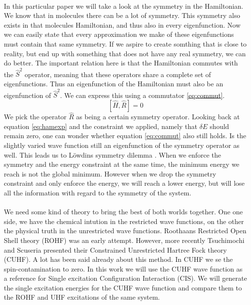 \documentclass[twoside,twocolumn,9pt]{article}
\begin{document}
\paragraph*{}
In this particular paper we will take a look at the symmetry in the Hamiltonian. We know that in molecules there can be a lot of symmetry. This symmetry also exists in that
molecules Hamiltonian, and thus also in every eigenfunction. Now we can easily state that every approximation we make of these eigenfunctions must contain that same symmetry.
If we aspire to create somthing that is close to reality, but end up with something that does not have any real symmetry, we can do better. The important relation here is that
the Hamiltonian commutes with the $\hat{S}^2$ operator, meaning that these operators share a complete set of eigenfunctions. Thus an eigenfunction of the Hamiltonian must also
be an eigenfunction of $\hat{S}^2$. We can express this using a commutator \eqref{eq:commut}.
\begin{equation}\label{eq:commut}
  [\hat{H}, \hat{R}] = 0
\end{equation}
We pick the operator $\hat{R}$ as being a certain symmetry operator. Looking back at equation \eqref{eq:hamexp} and the constraint we applied, namely that $\delta E$ should
remain zero, one can wonder whether equation \eqref{eq:commut} also still holds. Is the slightly varied wave function still an eigenfunction of the symmetry operator as well.
This leads us to Löwdins symmetry dilemma \cite{Lowdin1963}. When we enforce the symmetry and the energy constraint at the same time, the minimum energy we reach is not the
global minimum. However when we drop the symmetry constraint and only enforce the energy, we will reach a lower energy, but will lose all the information with regard to the
symmetry of the system.
\paragraph*{}
We need some kind of theory to bring the best of both worlds together. One one side, we have the chemical intution in the restricted wave functions, on the other the physical
truth in the unrestricted wave functions. Roothaans Restricted Open Shell theory (ROHF)\cite{Roothaan1960} was an early attempt. However, more recently Tsuchimochi and Scuseria
presented their Constrained Unrestricted Hartree Fock theory (CUHF)\cite{Scuseria2010}. A lot has been said already about this method\cite{Plakhutin2014, Scuseria2011}. In CUHF we
se the spin-contamination to zero. In this work we will use the CUHF wave function as a reference for Single excitation Configuration Interaction (CIS). We will generate the single
excitation energies for the CUHF wave function and compare them to the ROHF and UHF excitations of the same system.
\end{document}
